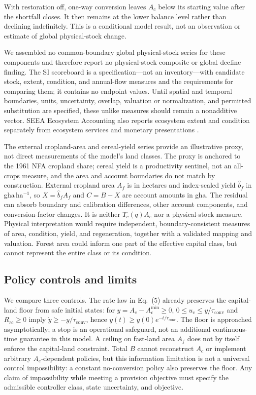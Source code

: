 \documentclass[preprint,12pt,authoryear]{elsarticle}
\newcommand{\Ups}{\Upsilon_c}
\newcommand{\Acmin}{A_c^{\min}}
\newcommand{\tconv}{\tau_{\mathrm{conv}}}
\begin{document}
With restoration off, one-way conversion leaves $A_c$ below its starting value after the shortfall closes. It then remains at the lower balance level rather than declining indefinitely. This is a conditional model result, not an observation or estimate of global physical-stock change.

We assembled no common-boundary global physical-stock series for these components and therefore report no physical-stock composite or global decline finding. The SI scoreboard is a specification—not an inventory—with candidate stock, extent, condition, and annual-flow measures and the requirements for comparing them; it contains no endpoint values. Until spatial and temporal boundaries, units, uncertainty, overlap, valuation or normalization, and permitted substitution are specified, these unlike measures should remain a nonadditive vector. SEEA Ecosystem Accounting also reports ecosystem extent and condition separately from ecosystem services and monetary presentations \citep{UN2021SEEA_EA}.

The external cropland-area and cereal-yield series provide an illustrative proxy, not direct measurements of the model's land classes. The proxy is anchored to the 1961 NFA cropland share; cereal yield is a productivity sentinel, not an all-crops measure, and the area and account boundaries do not match by construction. External cropland area $A_f$ is in hectares and index-scaled yield $\hat b_f$ in gha\,ha$^{-1}$, so $X=\hat b_fA_f$ and $C=B-X$ are account amounts in gha. The residual can absorb boundary and calibration differences, other account components, and conversion-factor changes. It is neither $\Ups(q)A_c$ nor a physical-stock measure. Physical interpretation would require independent, boundary-consistent measures of area, condition, yield, and regeneration, together with a validated mapping and valuation. Forest area could inform one part of the effective capital class, but cannot represent the entire class or its condition.

\subsection{Policy controls and limits}

We compare three controls. The rate law in Eq.~(5) already preserves the capital-land floor from safe initial states: for $y=A_c-\Acmin\ge0$, $0\le u_c\le y/\tconv$ and $R_{rc}\ge0$ imply $\dot y\ge-y/\tconv$, hence $y(t)\ge y(0)e^{-t/\tconv}$. The floor is approached asymptotically; a stop is an operational safeguard, not an additional continuous-time guarantee in this model. A ceiling on fast-land area $A_f$ does not by itself enforce the capital-land constraint. Total $B$ cannot reconstruct $A_c$ or implement arbitrary $A_c$-dependent policies, but this information limitation is not a universal control impossibility: a constant no-conversion policy also preserves the floor. Any claim of impossibility while meeting a provision objective must specify the admissible controller class, state uncertainty, and objective.
\end{document}
